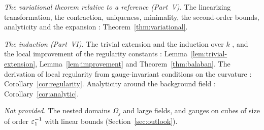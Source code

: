 \emph{The variational theorem relative to a reference (Part~V).} The linearizing transformation, the contraction, uniqueness, minimality, the second-order bounds, analyticity and the expansion \cite[Sects.~C--E, G]{BalVar}: Theorem~\ref{thm:variational}.

\emph{The induction (Part~VI).} The trivial extension and the induction over $k$ \cite[Sect.~A, (11)--(14)]{BalVar}, and the local improvement of the regularity constants \cite[Sect.~F]{BalVar}: Lemma~\ref{lem:trivial-extension}, Lemma~\ref{lem:improvement} and Theorem~\ref{thm:balaban}. The derivation of local regularity from gauge-invariant conditions on the curvature \cite[Sect.~F, Prop.~6]{BalReg}: Corollary~\ref{cor:regularity}. Analyticity around the background field \cite[Sect.~G]{BalVar}: Corollary~\ref{cor:analytic}.

\emph{Not provided.} The nested domains $\Omega_j$ and large fields, and gauges on cubes of size of order $\varepsilon_1^{-1}$ with linear bounds (Section~\ref{sec:outlook}).
